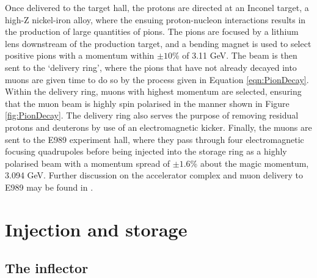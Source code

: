 Once delivered to the target hall, the protons are directed at an Inconel target, a high-Z nickel-iron alloy, where the ensuing proton-nucleon interactions results in the production of large quantities of pions. The pions are focused by a lithium lens downstream of the production target, and a bending magnet is used to select positive pions with a momentum within $\pm10$\% of 3.11 GeV. The beam is then sent to the `delivery ring', where the pions that have not already decayed into muons are given time to do so by the process given in Equation \ref{eqn:PionDecay}. Within the delivery ring, muons with highest momentum are selected, ensuring that the muon beam is highly spin polarised in the manner shown in Figure \ref{fig:PionDecay}. The delivery ring also serves the purpose of removing residual protons and deuterons by use of an electromagnetic kicker. Finally, the muons are sent to the E989 experiment hall, where they pass through four electromagnetic focusing quadrupoles before being injected into the storage ring as a highly polarised beam with a momentum spread of $\pm1.6$\% \cite{BeamDynamics} about the magic momentum, 3.094 GeV. Further discussion on the accelerator complex and muon delivery to E989 may be found in \cite{FermilabBeamline}.

\section{Injection and storage}\label{sec:InjectionAndStorage}

\subsection{The inflector}

